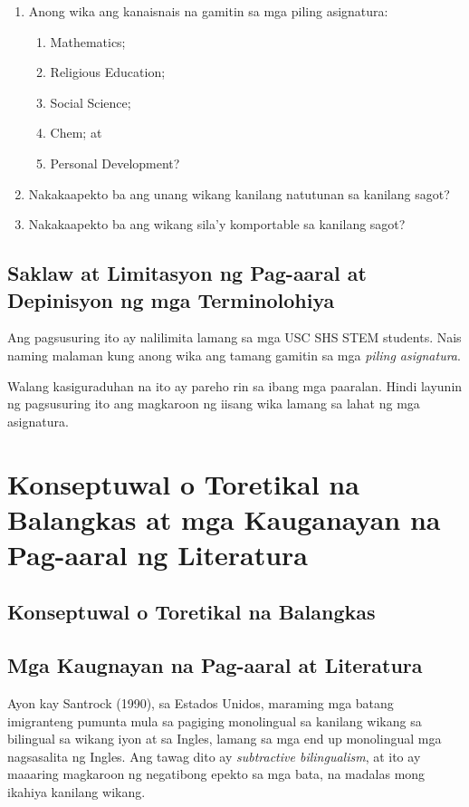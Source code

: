 \documentclass [parskip=full, 11pt] {scrreprt}
\begin{document}
\begin{enumerate}[parsep=\baselineskip,itemsep=-0.5\baselineskip]
\item Anong wika ang kanaisnais na gamitin sa mga piling asignatura:
  \begin{enumerate}[nosep]
  \item Mathematics;
  \item Religious Education;
  \item Social Science;
  \item Chem; at
  \item Personal Development?
  \end{enumerate}
\item Nakakaapekto ba ang unang wikang kanilang natutunan sa kanilang sagot?
\item Nakakaapekto ba ang wikang sila'y komportable sa kanilang sagot?
\end{enumerate}

\pagebreak
\section {Saklaw at Limitasyon ng Pag-aaral at Depinisyon ng mga Terminolohiya}
Ang pagsusuring ito ay nalilimita lamang sa mga USC SHS STEM students. Nais
naming malaman kung anong wika ang tamang gamitin sa mga \emph{piling
  asignatura}.

Walang kasiguraduhan na ito ay pareho rin sa ibang mga paaralan. Hindi layunin
ng pagsusuring ito ang magkaroon ng iisang wika lamang sa lahat ng mga
asignatura.


\pagebreak
\chapter{Konseptuwal o Toretikal na Balangkas at mga Kauganayan na Pag-aaral ng Literatura}
\section {Konseptuwal o Toretikal na Balangkas}
\pagebreak
\section {Mga Kaugnayan na Pag-aaral at Literatura}
Ayon kay Santrock (1990), sa Estados Unidos, maraming mga batang imigranteng
pumunta mula sa pagiging monolingual sa kanilang wikang sa bilingual sa wikang
iyon at sa Ingles, lamang sa mga end up monolingual mga nagsasalita ng Ingles.
Ang tawag dito ay \emph{subtractive bilingualism}, at ito ay maaaring magkaroon
ng negatibong epekto sa mga bata, na madalas mong ikahiya kanilang wikang.
\end{document}
